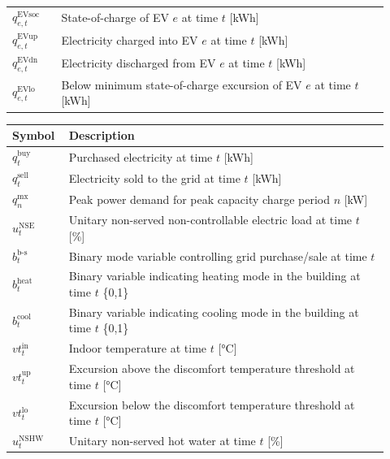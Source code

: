 \documentclass[11pt]{article}
\begin{document}
\begin{center}
\begin{tabular}{p{0.12\linewidth}p{0.8\linewidth}}
\(q^\text{EVsoc}_{e,t}\) & State-of-charge of EV \(e\) at time \(t\) [kWh] \\
\(q^\text{EVup}_{e,t}\) & Electricity charged into EV \(e\) at time \(t\) [kWh] \\
\(q^\text{EVdn}_{e,t}\) & Electricity discharged from EV \(e\) at time \(t\) [kWh] \\
\(q^\text{EVlo}_{e,t}\) & Below minimum state-of-charge excursion of EV \(e\) at time \(t\) [kWh] \\
\hline
\end{tabular}
\captionsetup{type=table}
\label{tab:variables_catalog}
\end{center}

\begin{center}
\centering
\begin{tabular}{p{0.12\linewidth}p{0.8\linewidth}}
\hline
\textbf{Symbol} & \textbf{Description} \\
\hline
\(q^\text{buy}_t\) & Purchased electricity at time \(t\) [kWh] \\
\(q^\text{sell}_t\) & Electricity sold to the grid at time \(t\) [kWh] \\
\(q^\text{mx}_n\) & Peak power demand for peak capacity charge period \(n\) [kW] \\
\(u^\text{NSE}_t\) & Unitary non-served non-controllable electric load at time \(t\) [\%] \\
\(b^\text{b-s}_t\) & Binary mode variable controlling grid purchase/sale at time \(t\) \\
\(b^\text{heat}_t\) & Binary variable indicating heating mode in the building at time \(t\) \{0,1\} \\
\(b^\text{cool}_t\) & Binary variable indicating cooling mode in the building at time \(t\) \{0,1\} \\
\(vt^\text{in}_t\) & Indoor temperature at time \(t\) [°C] \\
\(vt^\text{up}_t\) & Excursion above the discomfort temperature threshold at time \(t\) [°C] \\
\(vt^\text{lo}_t\) & Excursion below the discomfort temperature threshold at time \(t\) [°C] \\
\(u^\text{NSHW}_t\) & Unitary non-served hot water at time \(t\) [\%] \\
\hline
\end{tabular}
\captionsetup{type=table}
\label{tab:variables_balance}
\end{center}
\end{document}
